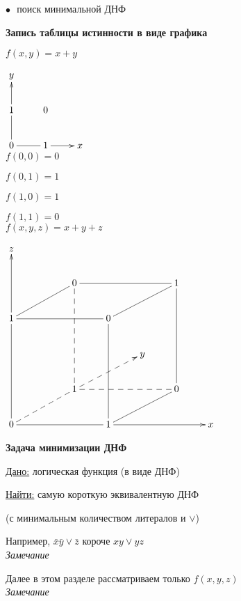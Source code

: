\documentclass[a4paper, 12pt] {article}
\begin{document}
$ \bullet $ $  $ поиск минимальной ДНФ\\

\newpage

\textbf{Запись таблицы истинности в виде графика}

$ f(x, y) = x+y $

$ 
\begin{matrix}
	\xymatrix{
		y\\
		1 \ar@{->}[u] & 0\\
		0 \ar@{-}[u] \ar@{-}[r] & 1 \ar@{->}[r] & x\\	
	}
\end{matrix}
 $\\
 
$ f(0, 0) = 0 $

$ f(0, 1) = 1 $
 
$ f(1, 0) = 1 $
  
$ f(1, 1) = 0 $\\

$ f(x, y, z) = x+y+z $

$ 
\begin{matrix}
	\xymatrix{
		z &   &  &   & & &\\
		&   & 0 \ar@{-}[lld] \ar@{--}[ddd] &   & & 1 \ar@{-}[lld] \ar@{-}[lll]&\\
		1 \ar@{->}[uu] \ar@{-}[rrr] &   &  & 0  & & &\\
		&   &  &   & y & &\\
		&   & 1 \ar@{--}[lld] \ar@{-->}[rru] \ar@{--}[rrr] &   & & 0 \ar@{-}[uuu]  &\\
		0  \ar@{-}[uuu] \ar@{-}[rrr] & & & 1 \ar@{->}[rrr] \ar@{-}[uuu] \ar@{-}[rru] & & & x \\
	}
\end{matrix}
$

\newpage

\textbf{Задача минимизации ДНФ}

\underline{Дано:} логическая функция (в виде ДНФ)

\underline{Найти:} самую короткую эквивалентную ДНФ 

(с минимальным количеством литералов и $ \vee $)

Например, $ \bar x \bar y \vee \bar z $ короче $ xy \vee yz $\\

\textit{Замечание}

Далее в этом разделе рассматриваем только $ f(x, y, z) $\\

\textit{Замечание}
\end{document}
